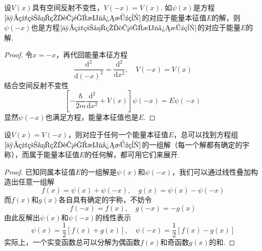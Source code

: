 \begin{theorem}\label{定理3}
    设$V(x)$具有空间反射不变性，$V(-x)=V(x)$. 如$\psi(x)$是方程$\eqref{一维粒子的能量本征方程}$的对应于能量本征值$E$的解，则$\psi(-x)$也是方程$\eqref{一维粒子的能量本征方程}$的对应于能量$E$的解.
\end{theorem}

\begin{proof}
    令$x=-x$，再代回能量本征方程
    $$
        \frac{\mathrm{d}^2}{\mathrm{d}(-x)^2}=\frac{\mathrm{d}^2}{\mathrm{d}x^2}, \quad V(-x)=V(x)
    $$
    结合空间反射不变性
    $$
        \left[-\frac{\hbar}{2m}\frac{\mathrm{d}^2}{\mathrm{d}x^2}+V(x)\right]\psi(-x)=E\psi(-x)
    $$
    显然$\psi(-x)$也满足方程，能量本征值也是$E$.
\end{proof}




\begin{theorem}\label{定理4}
    设$V(x)=V(-x)$，则对应于任何一个能量本征值$E$，总可以找到方程组$\eqref{一维粒子的能量本征方程}$的一组解（每一个解都有确定的宇称），而属于能量本征值$E$的任何解，都可用它们来展开.
\end{theorem}
\begin{proof}
    已知同属本征值$E$的一组解是$\psi(x)$和$\psi(-x)$，我们可以通过线性叠加构造出任意一组解
    $$
        f(x)=\psi(x)+\psi(-x), \quad g(x)=\psi(x)-\psi(-x)
    $$
    而$f(x)$和$g(x)$各自具有确定的宇称，不妨令
    $$
        f(-x)=f(x), \quad g(-x)=-g(x)
    $$
    由此反解出$\psi(x)$和$\psi(-x)$的线性表示
    $$
        \psi(x)=\frac{1}{2}[f(x)+g(x)], \quad \psi(-x)=\frac{1}{2}[f(x)-g(x)]
    $$
    实际上，一个实变函数总可以分解为偶函数$f(x)$和奇函数$g(x)$的和.
\end{proof}




